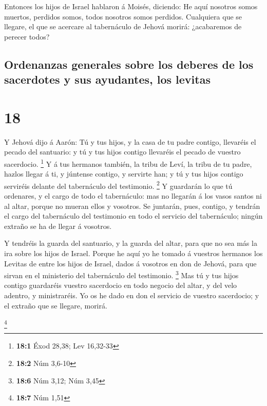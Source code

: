  Entonces los hijos de Israel hablaron á Moisés,
diciendo: He aquí nosotros somos muertos, perdidos somos, todos nosotros
somos perdidos.  Cualquiera que se llegare, el que se
acercare al tabernáculo de Jehová morirá: ¿acabaremos de perecer todos?

\hypertarget{ordenanzas-generales-sobre-los-deberes-de-los-sacerdotes-y-sus-ayudantes-los-levitas}{%
\subsection{Ordenanzas generales sobre los deberes de los sacerdotes y
sus ayudantes, los
levitas}\label{ordenanzas-generales-sobre-los-deberes-de-los-sacerdotes-y-sus-ayudantes-los-levitas}}

\hypertarget{section-17}{%
\section{18}\label{section-17}}

 Y Jehová dijo á Aarón: Tú y tus hijos, y la casa de tu
padre contigo, llevaréis el pecado del santuario: y tú y tus hijos
contigo llevaréis el pecado de vuestro sacerdocio. \footnote{\textbf{18:1}
  Éxod 28,38; Lev 16,32-33}  Y á tus hermanos también, la
tribu de Leví, la tribu de tu padre, hazlos llegar á ti, y júntense
contigo, y servirte han; y tú y tus hijos contigo serviréis delante del
tabernáculo del testimonio. \footnote{\textbf{18:2} Núm 3,6-10}
 Y guardarán lo que tú ordenares, y el cargo de todo el
tabernáculo: mas no llegarán á los vasos santos ni al altar, porque no
mueran ellos y vosotros.  Se juntarán, pues, contigo, y
tendrán el cargo del tabernáculo del testimonio en todo el servicio del
tabernáculo; ningún extraño se ha de llegar á vosotros.

 Y tendréis la guarda del santuario, y la guarda del
altar, para que no sea más la ira sobre los hijos de Israel.
 Porque he aquí yo he tomado á vuestros hermanos los
Levitas de entre los hijos de Israel, dados á vosotros en don de Jehová,
para que sirvan en el ministerio del tabernáculo del testimonio.
\footnote{\textbf{18:6} Núm 3,12; Núm 3,45}  Mas tú y tus
hijos contigo guardaréis vuestro sacerdocio en todo negocio del altar, y
del velo adentro, y ministraréis. Yo os he dado en don el servicio de
vuestro sacerdocio; y el extraño que se llegare, morirá.

\footnote{\textbf{18:7} Núm 1,51}

